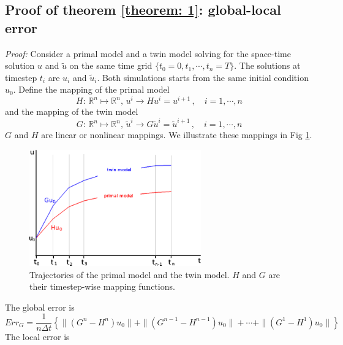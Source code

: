 \documentclass[a4paper,onecolumn]{article}
\theoremstyle{remark}
\begin{document}
\begin{appendices}
    \section{Proof of theorem \ref{theorem: 1}: global-local error}
    \label{appendix 1}
    \emph{Proof:} Consider a primal model and a twin model solving
    for the space-time solution $u$ and $\tilde{u}$ on the same
    time grid $\{t_0=0,t_1,\cdots, t_n=T\}$. The solutions at timestep $t_i$
    are $u_i$ and $\tilde{u}_{i}$. Both simulations 
    starts from the same initial condition $u_0$. Define the mapping
    of the primal model 
    \begin{equation}
        H:\, \mathbb{R}^n\mapsto\mathbb{R}^n,\, u^i\rightarrow Hu^i = u^{i+1}\,,
        \quad i=1,\cdots, n
    \end{equation}
    and the mapping of the twin model
    \begin{equation}
        G:\, \mathbb{R}^n\mapsto\mathbb{R}^n,\, \tilde{u}^i\rightarrow 
        G\tilde{u}^i = \tilde{u}^{i+1}\,,\quad i=1,\cdots, n
    \end{equation}
    $G$ and $H$ are linear or nonlinear mappings.
    We illustrate these mappings in Fig \ref{fig:sketch}.
    \begin{figure}[H]\begin{center}
        \includegraphics[height=5cm]{sketch.png}
        \caption{Trajectories of the primal model and the twin model. 
                 $H$ and $G$ are their timestep-wise mapping functions.}
        \label{fig:sketch}
    \end{center}\end{figure}
    \noindent The global error is
    \begin{equation}
        Err_G = \frac{1}{n\Delta t}\left\{ \|(G^n - H^n) u_0\| + \|(G^{n-1}-H^{n-1})u_0\|
        +\cdots+\|(G^1-H^1)u_0\| \right\}
        \label{global error}
    \end{equation}
    The local error is
    \begin{equation}

\end{equation}
\end{appendices}
\end{document}
